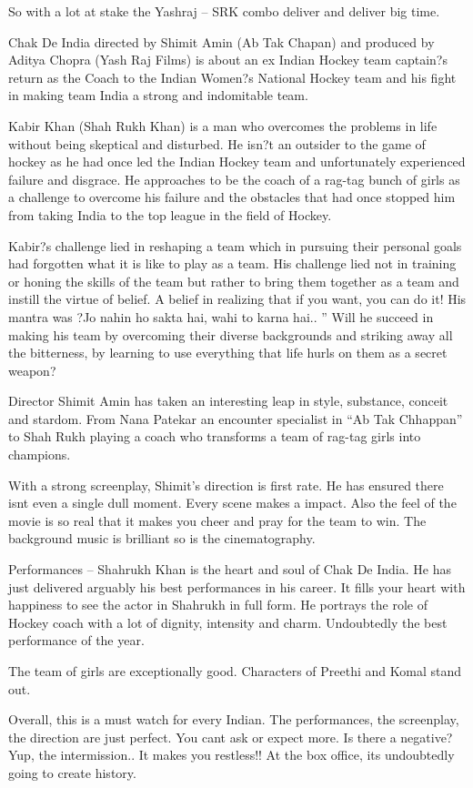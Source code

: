 \documentclass[11pt]{article}
\begin{document}
So with a lot at stake the Yashraj – SRK combo deliver and deliver big time.

Chak De India directed by Shimit Amin (Ab Tak Chapan) and produced by Aditya Chopra (Yash Raj Films) is about an ex Indian Hockey team captain?s return as the Coach to the Indian Women?s National Hockey team and his fight in making team India a strong and indomitable team.

Kabir Khan (Shah Rukh Khan) is a man who overcomes the problems in life without being skeptical and disturbed. He isn?t an outsider to the game of hockey as he had once led the Indian Hockey team and unfortunately experienced failure and disgrace. He approaches to be the coach of a rag-tag bunch of girls as a challenge to overcome his failure and the obstacles that had once stopped him from taking India to the top league in the field of Hockey.

Kabir?s challenge lied in reshaping a team which in pursuing their personal goals had forgotten what it is like to play as a team. His challenge lied not in training or honing the skills of the team but rather to bring them together as a team and instill the virtue of belief. A belief in realizing that if you want, you can do it! His mantra was ?Jo nahin ho sakta hai, wahi to karna hai.. ” Will he succeed in making his team by overcoming their diverse backgrounds and striking away all the bitterness, by learning to use everything that life hurls on them as a secret weapon?

Director Shimit Amin has taken an interesting leap in style, substance, conceit and stardom. From Nana Patekar an encounter specialist in “Ab Tak Chhappan” to Shah Rukh playing a coach who transforms a team of rag-tag girls into champions.

With a strong screenplay, Shimit’s direction is first rate. He has ensured there isnt even a single dull moment. Every scene makes a impact. Also the feel of the movie is so real that it makes you cheer and pray for the team to win. The background music is brilliant so is the cinematography.

Performances – Shahrukh Khan is the heart and soul of Chak De India. He has just delivered arguably his best performances in his career. It fills your heart with happiness to see the actor in Shahrukh in full form. He portrays the role of Hockey coach with a lot of dignity, intensity and charm. Undoubtedly the best performance of the year.

The team of girls are exceptionally good. Characters of Preethi and Komal stand out.

Overall, this is a must watch for every Indian. The performances, the screenplay, the direction are just perfect. You cant ask or expect more. Is there a negative? Yup, the intermission.. It makes you restless!! At the box office, its undoubtedly going to create history.
\end{document}
